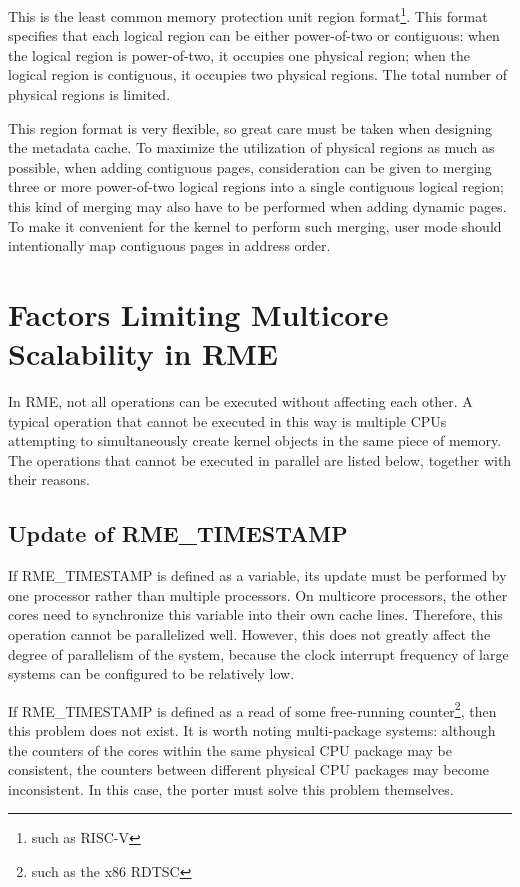 This is the least common memory protection unit region format\footnote{such as RISC-V}. This format specifies that each logical region can be either power-of-two or contiguous: when the logical region is power-of-two, it occupies one physical region; when the logical region is contiguous, it occupies two physical regions. The total number of physical regions is limited.

This region format is very flexible, so great care must be taken when designing the metadata cache. To maximize the utilization of physical regions as much as possible, when adding contiguous pages, consideration can be given to merging three or more power-of-two logical regions into a single contiguous logical region; this kind of merging may also have to be performed when adding dynamic pages. To make it convenient for the kernel to perform such merging, user mode should intentionally map contiguous pages in address order.

\section{Factors Limiting Multicore Scalability in RME}\label{sec:9-multicore-scalability-limits}

In RME, not all operations can be executed without affecting each other. A typical operation that cannot be executed in this way is multiple CPUs attempting to simultaneously create kernel objects in the same piece of memory. The operations that cannot be executed in parallel are listed below, together with their reasons.

\subsection{Update of RME\_TIMESTAMP}\label{subsec:9-timestamp-update}

If RME\_TIMESTAMP is defined as a variable, its update must be performed by one processor rather than multiple processors. On multicore processors, the other cores need to synchronize this variable into their own cache lines. Therefore, this operation cannot be parallelized well. However, this does not greatly affect the degree of parallelism of the system, because the clock interrupt frequency of large systems can be configured to be relatively low.

If RME\_TIMESTAMP is defined as a read of some free-running counter\footnote{such as the x86 RDTSC}, then this problem does not exist. It is worth noting multi-package systems: although the counters of the cores within the same physical CPU package may be consistent, the counters between different physical CPU packages may become inconsistent. In this case, the porter must solve this problem themselves.

